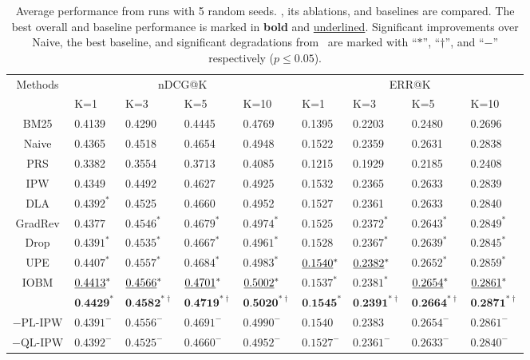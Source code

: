 \begin{table}[t]
\setlength{\tabcolsep}{0.2pt}
\footnotesize
 \centering
  \caption{Average performance from runs with 5 random seeds. \m, its ablations, and baselines are compared. The best overall and baseline performance is marked in \textbf{bold} and \uline{underlined}. Significant improvements over Naive, the best baseline, and significant degradations from \m~are marked with ``$*$'', ``$\dag$'', and ``$-$'' respectively ($p\leq0.05$).}
 \begin{tabular}{cllllllll}\toprule
   \multirow{2}{*}{Methods} & \multicolumn{4}{c}{nDCG@K} & \multicolumn{4}{c}{ERR@K}
    \\\cmidrule(r){2-5}\cmidrule{6-9}
             & K=1 & K=3 & K=5 & K=10 & K=1 & K=3 & K=5 & K=10\\\midrule
BM25&0.4139&0.4290&0.4445&0.4769&0.1395&0.2203&0.2480&0.2696\\\hline
Naive&0.4365&0.4518&0.4654&0.4948&0.1522&0.2359&0.2631&0.2838\\\hline
PRS&0.3382&0.3554&0.3713&0.4085&0.1215&0.1929&0.2185&0.2408\\\hline
IPW&0.4349&0.4492&0.4627&0.4925&0.1532&0.2365&0.2633&0.2839\\
DLA&${0.4392}^*$&0.4525&0.4660&0.4952&0.1527&0.2361&0.2633&0.2840\\\hline
GradRev&${0.4377}$&${0.4546}^*$&${0.4679}^*$&${0.4974}^*$&${0.1525}$&${0.2372}^*$&${0.2643}^*$&${0.2849}^*$\\
Drop&${0.4391}^*$&${0.4535}^*$&${0.4667}^*$&${0.4961}^*$&${0.1528}$&${0.2367}^*$&${0.2639}^*$&${0.2845}^*$\\
UPE&${0.4407}^*$&${0.4557}^*$&${0.4684}^*$&${0.4983}^*$&$\uline{0.1540}^*$&$\uline{0.2382}^*$&${0.2652}^*$&${0.2859}^*$\\\hline
IOBM&$\uline{0.4413}^*$&$\uline{0.4566}^*$&$\uline{0.4701}^*$&$\uline{0.5002}^*$&${0.1537}^*$&${0.2381}^*$&$\uline{0.2654}^*$&$\uline{0.2861}^*$\\\hline
\m&$\textbf{0.4429}^{*}$&$\textbf{0.4582}^{*\dag}$&$\textbf{0.4719}^{*\dag}$&$\textbf{0.5020}^{*\dag}$&$\textbf{0.1545}^{*}$&$\textbf{0.2391}^{*\dag}$&$\textbf{0.2664}^{*\dag}$&$\textbf{0.2871}^{*\dag}$\\
${-\textrm{PL-IPW}}$&${0.4391}^-$&${0.4556}^-$&${0.4691}^-$&${0.4990}^-$&${0.1540}$&${0.2383}$&${0.2654}^-$&${0.2861}^-$\\
${-\textrm{QL-IPW}}$&${0.4392}^-$&${0.4525}^-$&${0.4660}^-$&${0.4952}^-$&${0.1527}^-$&${0.2361}^-$&${0.2633}^-$&${0.2840}^-$
    \\\bottomrule
 \end{tabular}
 \label{real_perform}
\end{table}

